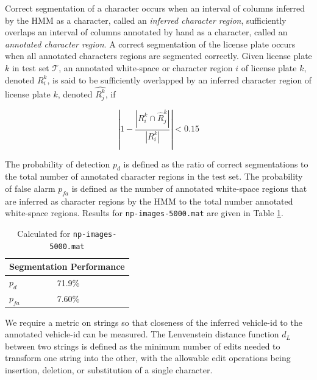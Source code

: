 \documentclass[a4paper,12pt]{article}
\newcommand{\test}{\ensuremath{\mathcal{T}}}
\begin{document}
Correct segmentation of a character occurs when an interval of columns
inferred by the HMM as a character, called an \emph{inferred character
  region}, sufficiently overlaps an interval of columns annotated by
hand as a character, called an \emph{annotated character region}. A
correct segmentation of the license plate occurs when all annotated
characters regions are segmented correctly. Given license plate $k$ in
test set \test, an annotated white-space or character region $i$
of license plate $k$, denoted $R^k_i$, is said to be sufficiently
overlapped by an inferred character region of license plate $k$,
denoted $\hat{R^k_j}$, if

\[
\left|1-\frac{|R^k_i \cap \hat{R}^k_j|}{|R^k_i|}\right| < 0.15
\] 

The probability of detection $p_d$ is defined as the ratio of correct
segmentations to the total number of annotated character regions in
the test set. The probability of false alarm $p_{fa}$ is defined as
the number of annotated white-space regions that are inferred as
character regions by the HMM to the total number annotated white-space
regions. Results for \texttt{np-images-5000.mat} are given in Table
\ref{table:segmentation}.

\begin{table}[ht]
\begin{center}
\begin{tabular}{|l|l|}
  \hline
  \multicolumn{2}{|c|}{Segmentation Performance} \\
  \hline
  $p_d$ & 71.9\% \\
  $p_{fa}$ & 7.60\% \\
  \hline
\end{tabular}
\caption{Calculated for \texttt{np-images-5000.mat}}
\label{table:segmentation}
\end{center}
\end{table}

We require a metric on strings so that closeness of the inferred
vehicle-id to the annotated vehicle-id can be measured. The
Lenvenstein distance function $d_L$ between two strings is defined as
the minimum number of edits needed to transform one string into the
other, with the allowable edit operations being insertion, deletion,
or substitution of a single character.
\end{document}
